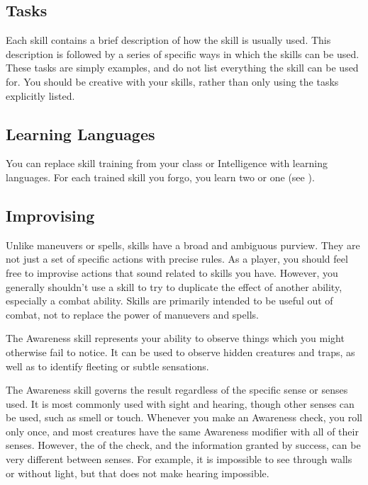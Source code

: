   \subsection{Tasks}\label{Tasks}
    Each skill contains a brief description of how the skill is usually used.
    This description is followed by a series of specific ways in which the skills can be used.
    These tasks are simply examples, and do not list everything the skill can be used for.
    You should be creative with your skills, rather than only using the tasks explicitly listed.

  \subsection{Learning Languages}
    You can replace skill training from your class or Intelligence with learning languages.
    For each trained skill you forgo, you learn two  or one  (see ).

  \subsection{Improvising}
    Unlike maneuvers or spells, skills have a broad and ambiguous purview.
    They are not just a set of specific actions with precise rules.
    As a player, you should feel free to improvise actions that sound related to skills you have.
    However, you generally shouldn't use a skill to try to duplicate the effect of another ability, especially a combat ability.
    Skills are primarily intended to be useful out of combat, not to replace the power of manuevers and spells.

\newpage
{}
  The Awareness skill represents your ability to observe things which you might otherwise fail to notice.
  It can be used to observe hidden creatures and traps, as well as to identify fleeting or subtle sensations.

  The Awareness skill governs the result regardless of the specific sense or senses used.
  It is most commonly used with sight and hearing, though other senses can be used, such as smell or touch.
  Whenever you make an Awareness check, you roll only once, and most creatures have the same Awareness modifier with all of their senses.
  However, the  of the check, and the information granted by success, can be very different between senses.
  For example, it is impossible to see through walls or without light, but that does not make hearing impossible.

